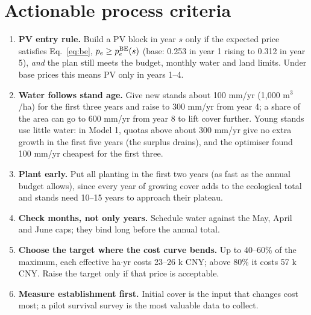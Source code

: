 \documentclass[11pt,a4paper]{article}
\begin{document}
\section{Actionable process criteria}\label{sec:rules}
\begin{enumerate}
\item \textbf{PV entry rule.} Build a PV block in year $s$ only if the expected price satisfies Eq.~\eqref{eq:be},
$p_e\ge p_e^{\rm BE}(s)$ (base: 0.253 in year 1 rising to 0.312 in year 5), \emph{and} the plan still meets the budget,
monthly water and land limits. Under base prices this means PV only in years 1--4.
\item \textbf{Water follows stand age.} Give new stands about 100 mm/yr (1,000 m$^3$/ha) for the first three years and
raise to 300 mm/yr from year 4; a share of the area can go to 600 mm/yr from year 8 to lift cover further.
Young stands use little water: in Model 1, quotas above about 300 mm/yr give no extra growth in the first five years (the surplus drains), and the optimiser found 100 mm/yr cheapest for the first three.
\item \textbf{Plant early.} Put all planting in the first two years (as fast as the annual budget allows), since every
year of growing cover adds to the ecological total and stands need 10--15 years to approach their plateau.
\item \textbf{Check months, not only years.} Schedule water against the May, April and June caps; they bind long before the annual total.
\item \textbf{Choose the target where the cost curve bends.} Up to 40--60\% of the maximum, each effective ha$\cdot$yr costs 23--26 k CNY;
above 80\% it costs 57 k CNY. Raise the target only if that price is acceptable.
\item \textbf{Measure establishment first.} Initial cover is the input that changes cost most; a pilot survival survey is the most valuable data to collect.
\end{enumerate}

\end{document}
